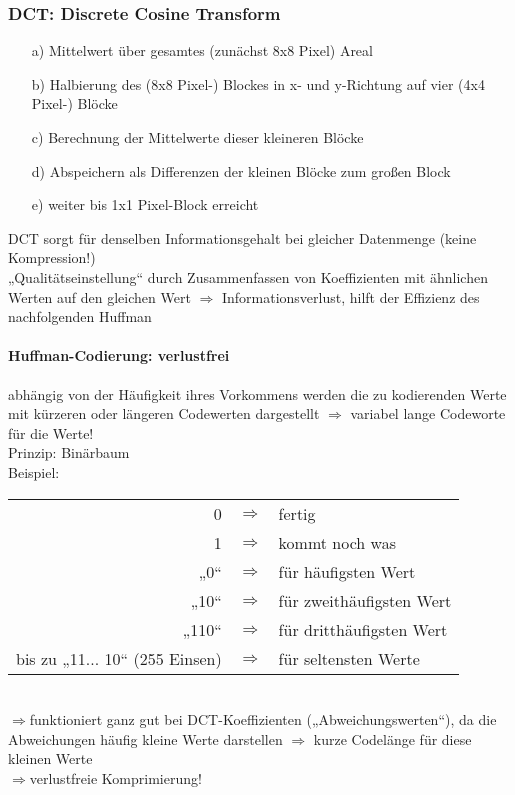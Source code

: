 \subsubsection{DCT: Discrete Cosine Transform}
\begin{itemize}
\item[a)] Mittelwert über gesamtes (zunächst 8x8 Pixel) Areal
\item[b)] Halbierung des (8x8 Pixel-) Blockes in x- und y-Richtung auf vier (4x4 Pixel-) Blöcke
\item[c)] Berechnung der Mittelwerte dieser kleineren Blöcke
\item[d)] Abspeichern als Differenzen der kleinen Blöcke zum großen Block
\item[e)] weiter bis 1x1 Pixel-Block erreicht
\end{itemize}
DCT sorgt für denselben Informationsgehalt bei gleicher Datenmenge (keine Kompression!)\\
„Qualitätseinstellung“ durch Zusammenfassen von Koeffizienten mit ähnlichen Werten auf den gleichen Wert $\Rightarrow$ Informationsverlust, hilft der Effizienz des nachfolgenden Huffman

\paragraph{Huffman-Codierung: verlustfrei}abhängig von der Häufigkeit ihres Vorkommens werden die zu kodierenden Werte mit kürzeren oder längeren Codewerten dargestellt $\Rightarrow$ variabel lange Codeworte für die Werte!\\
Prinzip: Binärbaum\\
Beispiel:
\begin{table}[h]
\begin{tabular}{rcl}
0 & $\Rightarrow$ & fertig \\
1  & $\Rightarrow$ & kommt noch was\\
„0“  & $\Rightarrow$ & für häufigsten Wert\\
„10“  & $\Rightarrow$ & für zweithäufigsten Wert\\
„110“ & $\Rightarrow$ & für dritthäufigsten Wert\\
bis zu „11... 10“ (255 Einsen) & $\Rightarrow$ & für seltensten Werte
\end{tabular}
\end{table}\\
$\Rightarrow$funktioniert ganz gut bei DCT-Koeffizienten („Abweichungswerten“), da die Abweichungen häufig kleine Werte darstellen $\Rightarrow$ kurze Codelänge für diese kleinen Werte\\
$\Rightarrow$verlustfreie Komprimierung!

